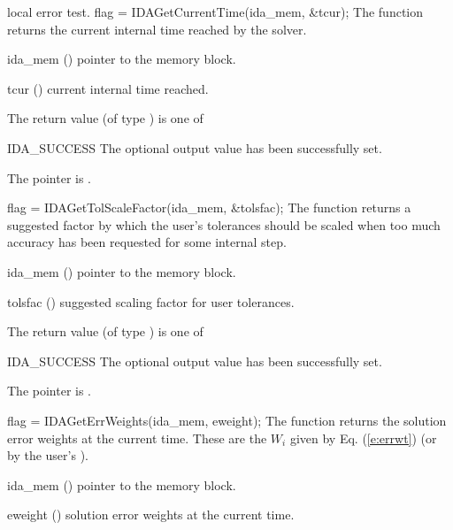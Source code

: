 {{  local error test.
}
{
  flag = IDAGetCurrentTime(ida\_mem, \&tcur);
}
{
  The function  returns the
  current internal time reached by the solver.
}
{
  \begin{args}
  \item[ida\_mem] ()
    pointer to the {\ida} memory block.
  \item[tcur] ()
    current internal time reached.
  \end{args}
}
{
  The return value  (of type ) is one of
  \begin{args}
  \item[IDA\_SUCCESS]
    The optional output value has been successfully set.
  \item[\Id{IDA\_MEM\_NULL}]
    The  pointer is .
  \end{args}
}
{}
{
  flag = IDAGetTolScaleFactor(ida\_mem, \&tolsfac);
}
{
  The function  returns a
  suggested factor by which the user's tolerances
  should be scaled when too much accuracy has been
  requested for some internal step.
}
{
  \begin{args}[tolsfac]
  \item[ida\_mem] ()
    pointer to the {\ida} memory block.
  \item[tolsfac] ()
    suggested scaling factor for user tolerances.
  \end{args}
}
{
  The return value  (of type ) is one of
  \begin{args}
  \item[IDA\_SUCCESS]
    The optional output value has been successfully set.
  \item[\Id{IDA\_MEM\_NULL}]
    The  pointer is .
  \end{args}
}
{}
{
  flag = IDAGetErrWeights(ida\_mem, eweight);
}
{
  The function  returns the solution error weights
  at the current time. These are the $W_i$ given by Eq. (\ref{e:errwt})
  (or by the user's ).
}
{
  \begin{args}[eweight]
  \item[ida\_mem] ()
    pointer to the {\ida} memory block.
  \item[eweight] ()
    solution error weights at the current time.

\end{args}}}
